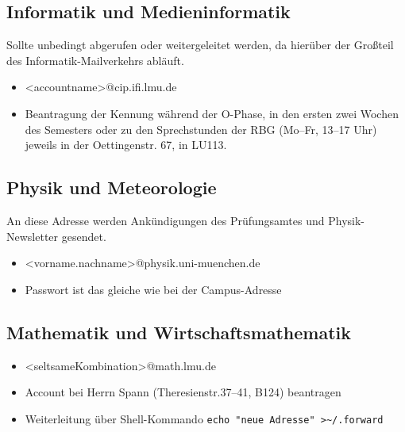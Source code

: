 \subsection*{Informatik und Medieninformatik \subjectList{\subjectI\subjectMI}}
Sollte unbedingt abgerufen oder weitergeleitet werden, da hierüber der Großteil des Informatik-Mailverkehrs abläuft. 
\begin{itemize}
	\item <accountname>@cip.ifi.lmu.de
	\item Beantragung der Kennung während der O-Phase, in den ersten zwei Wochen des Semesters oder zu den Sprechstunden der RBG 
		(Mo--Fr, 13--17 Uhr) jeweils in der Oettingenstr. 67, in LU113.
\end{itemize}
\begin{urlList} 	
\end{urlList}
	
\subsection*{Physik und Meteorologie\subjectList{\subjectP}}
An diese Adresse werden Ankündigungen des Prüfungsamtes und
Physik-Newsletter gesendet.

\begin{itemize}
	\item <vorname.nachname>@physik.uni-muenchen.de
	\item Passwort ist das gleiche wie bei der Campus-Adresse
\end{itemize}
		\begin{urlList}
		\end{urlList}
      
\subsection*{Mathematik und Wirtschaftsmathematik\subjectList{\subjectM\subjectW}}
\begin{itemize}
	\item <seltsameKombination>@math.lmu.de
	\item Account bei Herrn Spann (Theresienstr.37--41, B124) beantragen
	\item Weiterleitung über Shell-Kommando \verb|echo "neue Adresse" >~/.forward|
\end{itemize}

